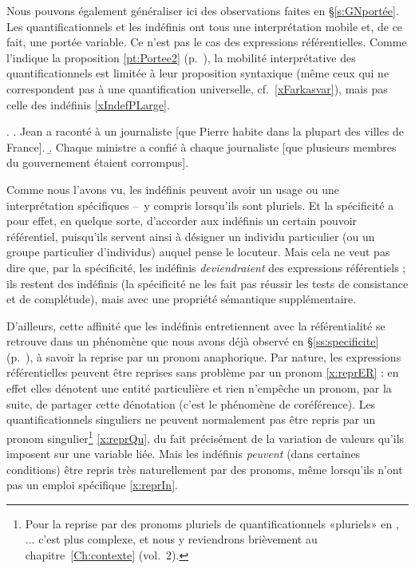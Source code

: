 \fussy

\smallskip

Nous pouvons également généraliser ici des observations faites en \S\ref{s:GNportée}.  Les {\GN} quantificationnels et les indéfinis ont tous une interprétation mobile et, de ce fait, une portée variable. Ce n'est pas le cas des expressions référentielles. Comme l'indique la proposition \ref{pt:Portee2} (p.~\pageref{pt:Portee2}), la mobilité interprétative des {\GN} quantificationnels est limitée à leur proposition syntaxique (même ceux qui ne correspondent pas à une quantification universelle, cf.\ \ref{xFarkasvar}), mais pas celle des indéfinis \ref{xIndefPLarge}.

\ex. 
\a. 
\juge{\urgh} Jean a raconté à un journaliste [que Pierre habite dans la plupart des  villes de France].\label{xFarkasvar}
\b. Chaque ministre a confié à chaque journaliste [que  plusieurs membres du gouvernement étaient corrompus].\label{xIndefPLarge}



Comme nous l'avons vu, les indéfinis peuvent avoir un usage ou une interprétation spécifiques --~y compris lorsqu'ils sont pluriels.  
Et la spécificité a pour effet, en quelque sorte, d'accorder aux  indéfinis un certain pouvoir référentiel, puisqu'ils servent ainsi à désigner un individu particulier (ou un groupe particulier d'individus) auquel pense le locuteur.   
Mais cela ne veut pas dire que, par la spécificité, les indéfinis \emph{deviendraient} des expressions référentiels ; ils restent des indéfinis (la spécificité ne les fait pas réussir les tests de consistance et de complétude), mais avec une  propriété sémantique supplémentaire.

D'ailleurs, cette affinité que les indéfinis entretiennent avec la référentialité se retrouve dans un phénomène que nous avons déjà observé en \S\ref{ss:specificite} (p.~\pageref{x:coquille1}), à savoir la reprise par un pronom anaphorique.
Par nature, les expressions référentielles peuvent être reprises sans problème par un pronom \ref{x:reprER} : en effet elles dénotent une entité particulière et rien n'empêche un pronom, par la suite, de partager cette dénotation (c'est le phénomène de coréférence).
Les {\GN} quantificationnels singuliers ne peuvent normalement pas être repris par un pronom singulier\footnote{Pour la reprise par des pronoms pluriels de quantificationnels «pluriels» en , ... c'est  plus complexe, et nous y reviendrons brièvement au chapitre~\ref{Ch:contexte} (vol.~2).} \ref{x:reprQu}, du fait précisément de la variation de valeurs qu'ils imposent sur une variable liée. 
Mais les indéfinis \emph{peuvent} (dans certaines conditions) être repris très naturellement par des pronoms, même lorsqu'ils n'ont pas un emploi spécifique \ref{x:reprIn}. 


